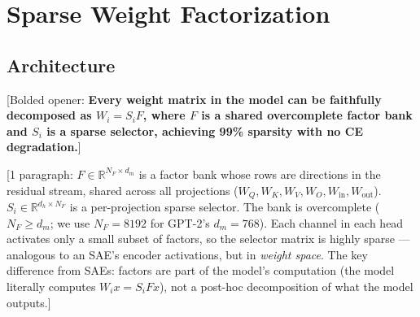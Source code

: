 \documentclass[11pt]{article}
\begin{document}

\section{Sparse Weight Factorization}
\label{sec:factorization}


\subsection{Architecture}


[Bolded opener: \textbf{Every weight matrix in the model can be faithfully
decomposed as $W_i = S_i F$, where $F$ is a shared overcomplete factor
bank and $S_i$ is a sparse selector, achieving 99\% sparsity with no
CE degradation.}]


[1 paragraph: $F \in \mathbb{R}^{N_F \times d_m}$ is a factor bank
whose rows are directions in the residual stream, shared across all
projections ($W_Q, W_K, W_V, W_O, W_{\text{in}}, W_{\text{out}}$).
$S_i \in \mathbb{R}^{d_h \times N_F}$ is a per-projection sparse
selector. The bank is overcomplete ($N_F \geq d_m$; we use $N_F = 8192$
for GPT-2's $d_m = 768$). Each channel in each head activates only a
small subset of factors, so the selector matrix is highly sparse ---
analogous to an SAE's encoder activations, but in \emph{weight space}.
The key difference from SAEs: factors are part of the model's computation
(the model literally computes $W_i x = S_i F x$), not a post-hoc
decomposition of what the model outputs.]
\end{document}
